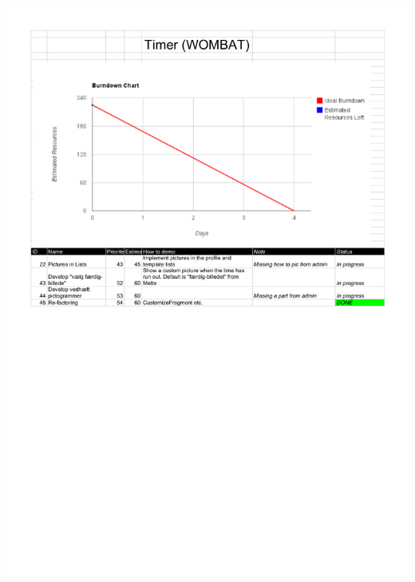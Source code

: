 \begin{center}
		\includegraphics[width=\textwidth]{Development/burndown_charts/Sprint_5.pdf}

\end{center}
